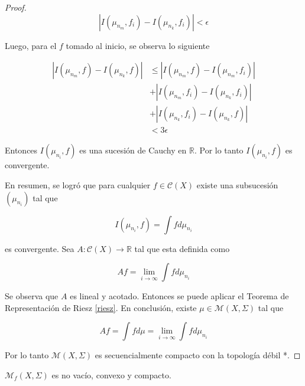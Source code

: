 \begin{proof}
	\begin{equation}
		|I(\mu_{n_m},f_i) - I(\mu_{n_k},f_i)| < \epsilon
	\end{equation}
	
	Luego, para el $f$ tomado al inicio, se observa lo siguiente
	
	\begin{align}
		|I(\mu_{n_m},f) - I(\mu_{n_k},f)| &\leq |I(\mu_{n_m},f) - I(\mu_{n_m},f_i) | \\
		& + |I(\mu_{n_m},f_i) - I(\mu_{n_k},f_i)| \\		
		& + |I(\mu_{n_k},f_i) - I(\mu_{n_k},f)|\\
		& < 3\epsilon
	\end{align}
	
	Entonces $I(\mu_{n_i},f)$ es una sucesión de Cauchy en $\mathbb{R}$. Por lo tanto $I(\mu_{n_i},f)$ es convergente.
	
	En resumen, se logró que para cualquier $f \in \mathcal{C}(X)$ existe una subsucesión $(\mu_{n_i})$ tal que
	
	\begin{equation}
		I(\mu_{n_i},f) = \int f d\mu_{n_i}
	\end{equation}
	
	es convergente. Sea $A: \mathcal{C}(X) \rightarrow \mathbb{R}$ tal que esta definida como
	
	\begin{equation}
		Af = \lim_{i \rightarrow \infty} \int f d \mu_{n_i}
	\end{equation}
	
	Se observa que $A$ es lineal y acotado. Entonces se puede aplicar el Teorema de Representación de Riesz \ref{riesz}. En conclusión, existe $\mu \in \mathcal{M}(X,\Sigma)$ tal que
	
	\begin{equation}
		Af = \int f d\mu = \lim_{i \rightarrow \infty} \int f d \mu_{n_i}
	\end{equation}
	
	Por lo tanto $\mathcal{M}(X,\Sigma)$ es secuencialmente compacto con la topología débil *.
\end{proof}

\begin{teorema}
	$\mathcal{M}_f(X,\Sigma)$ es no vacío, convexo y compacto.
\end{teorema}


